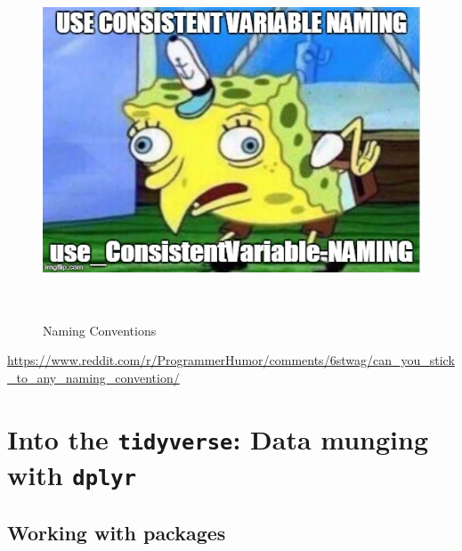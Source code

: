 \documentclass[
]{book}
\begin{document}
\begin{figure}
\centering
\includegraphics[width=\textwidth,height=4.16667in]{./img/varname.webp}
\caption{Naming Conventions}\label{id}
\end{figure}

\url{https://www.reddit.com/r/ProgrammerHumor/comments/6stwag/can_you_stick_to_any_naming_convention/}

\chapter{\texorpdfstring{Into the \texttt{tidyverse}: Data munging with \texttt{dplyr}}{Into the tidyverse: Data munging with dplyr}}\label{into-the-tidyverse-data-munging-with-dplyr}

\section{\texorpdfstring{Working with packages }{Working with packages }}\label{working-with-packages}
\end{document}
